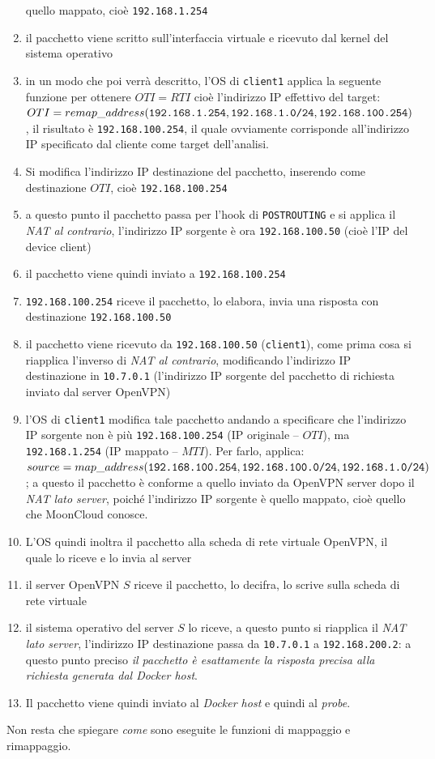 \begin{enumerate}
  quello mappato, cioè \texttt{192.168.1.254}
  \item il pacchetto viene scritto sull'interfaccia virtuale e ricevuto dal kernel
  del sistema operativo
  \item in un modo che poi verrà descritto, l'OS di \texttt{client1}
  applica la seguente funzione
  per ottenere $OTI=RTI$ cioè l'indirizzo IP effettivo del target: $OTI=remap\_address(
  \texttt{192.168.1.254}, \texttt{192.168.1.0/24},\\ \texttt{192.168.100.254})$, il
  risultato è \texttt{192.168.100.254}, il quale ovviamente corrisponde all'indirizzo IP
  specificato dal cliente come target dell'analisi.
  \item Si modifica l'indirizzo IP destinazione del pacchetto, inserendo come destinazione
  $OTI$, cioè \texttt{192.168.100.254}
  \item a questo punto il pacchetto passa per l'hook di \texttt{POSTROUTING} e si applica il
  \textit{NAT al contrario}, l'indirizzo IP sorgente è ora \texttt{192.168.100.50}
  (cioè l'IP del device client)
  \item il pacchetto viene quindi inviato a \texttt{192.168.100.254}
  \item \texttt{192.168.100.254} riceve il pacchetto, lo elabora, invia una risposta
  con destinazione \texttt{192.168.100.50}
  \item il pacchetto viene ricevuto da \texttt{192.168.100.50} (\texttt{client1}),
  come prima cosa
  si riapplica l'inverso di \textit{NAT al contrario}, modificando l'indirizzo IP
  destinazione in \texttt{10.7.0.1} (l'indirizzo IP sorgente del pacchetto di richiesta
  inviato dal server OpenVPN)
  \item l'OS di \texttt{client1} modifica tale
  pacchetto andando a specificare che l'indirizzo IP sorgente non è più
  \texttt{192.168.100.254} (IP originale -- $OTI$), ma \texttt{192.168.1.254}
  (IP mappato -- $MTI$). Per farlo, applica:
  $source=map\_address(\texttt{192.168.100.254}, \texttt{192.168.100.0/24},\\
  \texttt{192.168.1.0/24})$
  ; a questo il pacchetto è conforme a quello inviato da OpenVPN server dopo il
  \textit{NAT lato server}, poiché l'indirizzo IP sorgente è quello mappato, cioè quello
  che MoonCloud conosce.
  \item  L'OS quindi inoltra il pacchetto alla scheda di rete virtuale
  OpenVPN, il quale lo riceve e lo invia al server
  \item il server OpenVPN $S$ riceve il pacchetto, lo decifra, lo scrive sulla scheda di rete
  virtuale
  \item il sistema operativo del server $S$ lo riceve, a questo punto si riapplica
  il \textit{NAT lato server}, l'indirizzo IP destinazione passa da \texttt{10.7.0.1}
  a \texttt{192.168.200.2}: a questo punto preciso \textit{il pacchetto è esattamente
  la risposta precisa alla richiesta generata dal Docker host}.
  \item Il pacchetto viene quindi inviato al \textit{Docker host} e quindi al \textit{probe}.
\end{enumerate}
Non resta che spiegare \textit{come} sono eseguite le funzioni di mappaggio
e rimappaggio.


